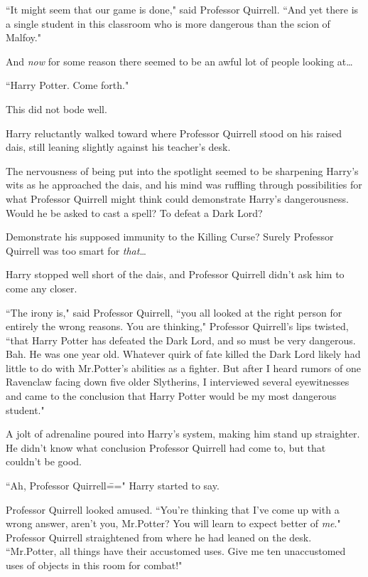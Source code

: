 ``It might seem that our game is done," said Professor Quirrell. ``And yet there is a single student in this classroom who is more dangerous than the scion of Malfoy."

And \emph{now} for some reason there seemed to be an awful lot of people looking at{\ldots}

``Harry Potter. Come forth."

This did not bode well.

Harry reluctantly walked toward where Professor Quirrell stood on his raised dais, still leaning slightly against his teacher's desk.

The nervousness of being put into the spotlight seemed to be sharpening Harry's wits as he approached the dais, and his mind was ruffling through possibilities for what Professor Quirrell might think could demonstrate Harry's dangerousness. Would he be asked to cast a spell? To defeat a Dark Lord?

Demonstrate his supposed immunity to the Killing Curse? Surely Professor Quirrell was too smart for \emph{that}{\ldots}

Harry stopped well short of the dais, and Professor Quirrell didn't ask him to come any closer.

``The irony is," said Professor Quirrell, ``you all looked at the right person for entirely the wrong reasons. You are thinking," Professor Quirrell's lips twisted, ``that Harry Potter has defeated the Dark Lord, and so must be very dangerous. Bah. He was one year old. Whatever quirk of fate killed the Dark Lord likely had little to do with Mr.\?Potter's abilities as a fighter. But after I heard rumors of one Ravenclaw facing down five older Slytherins, I interviewed several eyewitnesses and came to the conclusion that Harry Potter would be my most dangerous student."

A jolt of adrenaline poured into Harry's system, making him stand up straighter. He didn't know what conclusion Professor Quirrell had come to, but that couldn't be good.

``Ah, Professor Quirrell\===" Harry started to say.

Professor Quirrell looked amused. ``You're thinking that I've come up with a wrong answer, aren't you, Mr.\?Potter? You will learn to expect better of \emph{me}." Professor Quirrell straightened from where he had leaned on the desk. ``Mr.\?Potter, all things have their accustomed uses. Give me ten unaccustomed uses of objects in this room for combat!"


